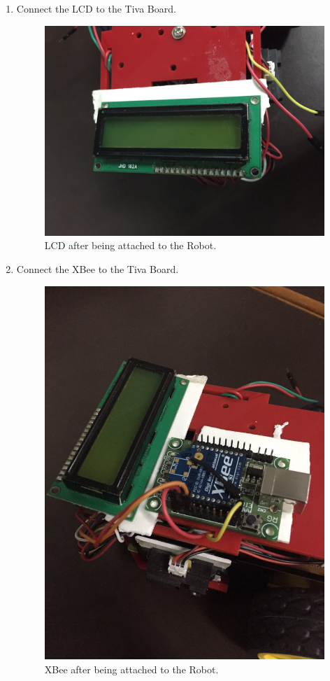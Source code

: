 \documentclass[a4paper,12pt,oneside]{book}
\begin{document}
\begin{enumerate}
	\item Connect the LCD to the Tiva Board.
	\begin{figure}[h]
		\centering
		\includegraphics[scale=0.16]{lcd_a}
		\caption{LCD after being attached to the Robot.}
	\end{figure}
	
	\item Connect the XBee to the Tiva Board.
	\begin{figure}[h]
		\centering
		\includegraphics[scale=0.16]{XBee_a}
		\caption{XBee after being attached to the Robot.}
	\end{figure}
	\newpage
	

\end{enumerate}
\end{document}
